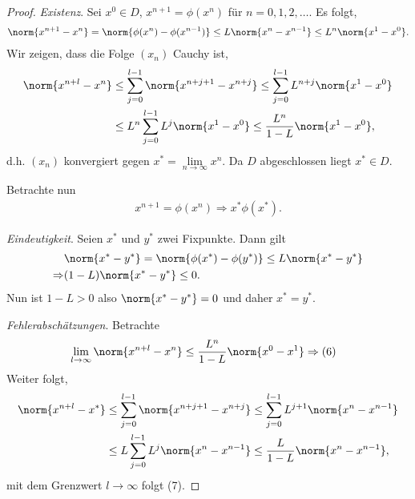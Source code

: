 \begin{proof}
\textit{Existenz}. Sei $x^0\in D$, $x^{n+1} = \phi(x^n)$ für $n=0,1,2,\ldots$.
Es folgt,
\begin{align*}
\norm{x^{n+1}-x^n} = \norm{\phi(x^n)-\phi(x^{n-1})}
\le L \norm{x^n-x^{n-1}}
\le L^n\norm{x^1-x^0}.
\end{align*}
Wir zeigen, dass die Folge $(x_n)$ Cauchy ist,
\begin{align*}
\norm{x^{n+l}-x^n} &\le \sum\limits_{j=0}^{l-1} \norm{x^{n+j+1}-x^{n+j}}
\le \sum\limits_{j=0}^{l-1} L^{n+j} \norm{x^1-x^0}
\\ &\le L^n \sum\limits_{j=0}^{l-1} L^j \norm{x^1-x^0}
\le \frac{L^n}{1-L} \norm{x^1-x^0},
\end{align*}
d.h. $(x_n)$ konvergiert gegen $x^* =\lim\limits_{n\to\infty} x^n$. Da $D$
abgeschlossen liegt $x^*\in D$.

Betrachte nun
\begin{align*}
x^{n+1} = \phi(x^n) \Rightarrow x^* \phi(x^*).
\end{align*}

\textit{Eindeutigkeit}. Seien $x^*$ und $y^*$ zwei Fixpunkte. Dann gilt
\begin{align*}
&\norm{x^*-y^*} = \norm{\phi(x^*)-\phi(y^*)} \le L\norm{x^*-y^*}\\
\Rightarrow & (1-L)\norm{x^*-y^*} \le 0.
\end{align*}
Nun ist $1-L>0$ also  $\norm{x^*-y^*} = 0$ und daher $x^*=y^*$.

\textit{Fehlerabschätzungen}. Betrachte
\begin{align*}
&\lim\limits_{l\to\infty} \norm{x^{n+l}-x^n} \le \frac{L^n}{1-L}\norm{x^0-x^1}
\Rightarrow (6)
\end{align*}
Weiter folgt,
\begin{align*}
\norm{x^{n+l}-x^*} &\le \sum\limits_{j=0}^{l-1} \norm{x^{n+j+1}-x^{n+j}} \le
\sum\limits_{j=0}^{l-1} L^{j+1} \norm{x^{n}-x^{n-1}}\\ 
&\le L \sum\limits_{j=0}^{l-1} L^{j} \norm{x^{n}-x^{n-1}}
\le \frac{L}{1-L}\norm{x^{n}-x^{n-1}},
\end{align*}
mit dem Grenzwert $l\to\infty$ folgt (7).\qedhere
\end{proof}


